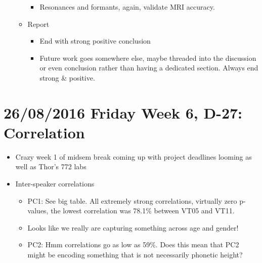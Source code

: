 \documentclass{article}
\begin{document}
\begin{itemize}
\begin{itemize}
\begin{itemize}
            \item Resonances and formants, again, validate MRI accuracy. 
        \end{itemize}
        \item Report
        \begin{itemize}
            \item End with strong positive conclusion
            \item Future work goes somewhere else, maybe threaded into the discussion or even conclusion rather than having a dedicated section. Always end strong & positive.
        \end{itemize}
    \end{itemize}
\end{itemize}

\section*{26/08/2016 Friday Week 6, D-27: Correlation}
\begin{itemize}
    \item Crazy week 1 of midsem break coming up with project deadlines looming as well as Thor's 772 labs
    \item Inter-speaker correlations
    \begin{itemize}
        \item PC1: See big table. All extremely strong correlations, virtually zero p-values, the lowest correlation was 78.1\% between VT05 and VT11.
        \item Looks like we really are capturing something across age and gender!
        \item PC2: Hmm correlations go as low as 59\%. Does this mean that PC2 might be encoding something that is not necessarily phonetic height?
    \end{itemize}
\end{itemize}
\end{document}
